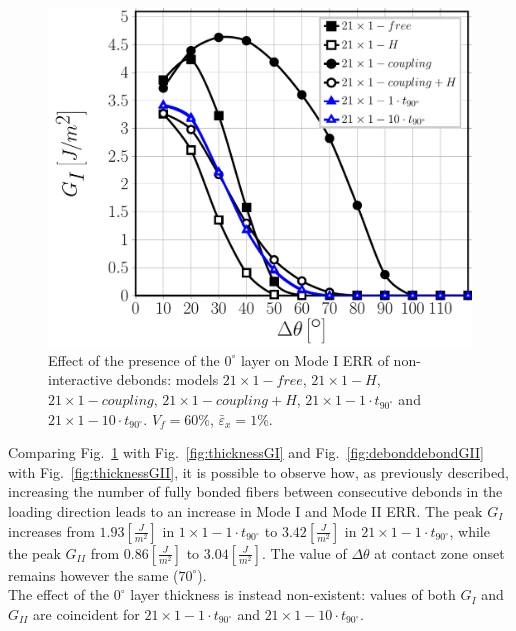 \documentclass[Review,sagev,times]{sagej}
\begin{document}
\begin{figure}[!htb]
\centering
\includegraphics[height=0.375\textheight]{nx1-1-vf60-GI.pdf}
\caption{Effect of the presence of the $0^{\circ}$ layer on Mode I ERR of non-interactive debonds: models $21\times 1-free$, $21\times 1-H$, $21\times 1-coupling$, $21\times 1-coupling+H$, $21\times 1-1\cdot t_{90^{\circ}}$ and $21\times 1-10\cdot t_{90^{\circ}}$. $V_{f}=60\%$, $\bar{\varepsilon}_{x}=1\%$.}\label{fig:debonddebondGI}
\end{figure}

Comparing Fig.~\ref{fig:debonddebondGI} with Fig.~\ref{fig:thicknessGI} and Fig.~\ref{fig:debonddebondGII} with Fig.~\ref{fig:thicknessGII}, it is possible to observe how, as previously described, increasing the number of fully bonded fibers between consecutive debonds in the loading direction leads to an increase in Mode I and Mode II ERR. The peak $G_{I}$ increases from $1.93 \left[\frac{J}{m^{2}}\right]$ in $1\times 1-1\cdot t_{90^{\circ}}$ to $3.42 \left[\frac{J}{m^{2}}\right]$ in $21\times 1-1\cdot t_{90^{\circ}}$, while the peak $G_{II}$ from $0.86 \left[\frac{J}{m^{2}}\right]$ to $3.04 \left[\frac{J}{m^{2}}\right]$. The value of $\Delta\theta$ at contact zone onset remains however the same ($70^{\circ}$).\\
The effect of the $0^{\circ}$ layer thickness is instead non-existent: values of both $G_{I}$ and $G_{II}$ are coincident for $21\times 1-1\cdot t_{90^{\circ}}$ and $21\times 1-10\cdot t_{90^{\circ}}$.\\
\end{document}
